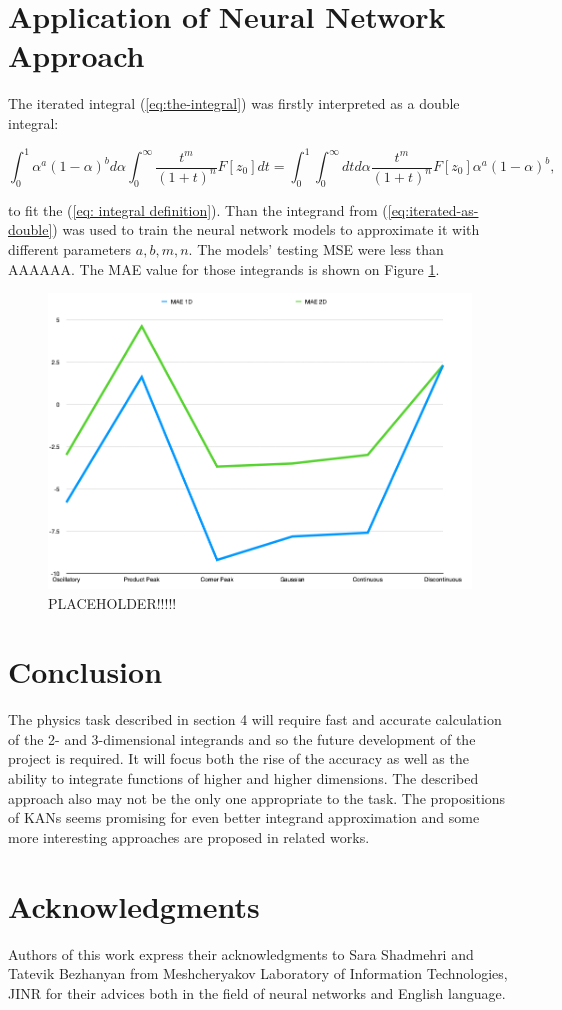 \documentclass[%
]{ittmm}
\begin{document}
\section{Application of Neural Network Approach}

The iterated integral (\ref{eq:the-integral}) was firstly interpreted as a double integral:

\begin{equation}
    \label{eq:iterated-as-double}
     \int_{0}^{1} \alpha^{a}(1 - \alpha)^bd\alpha \int_{0}^{\infty}\frac{t^m}{(1+t)^n}F[z_{0}]dt = 
     \int_{0}^{1} \int_{0}^{\infty} dtd\alpha \frac{t^m}{(1+t)^n}F[z_{0}]\alpha^{a}(1 - \alpha)^b,
\end{equation}

\noindent to fit the (\ref{eq: integral definition}). Than the integrand from (\ref{eq:iterated-as-double}) was used to train the neural network models to approximate it with different parameters $a, b, m, n$. The models' testing MSE were less than AAAAAA. The MAE value for those integrands is shown on Figure \ref{fig:ph-tests}.

\begin{figure}
\centering
\includegraphics[width=0.5\linewidth]{maes.png}
\caption{ PLACEHOLDER!!!!!}
\label{fig:ph-tests}
\end{figure}

\section{Conclusion}

The physics task described in section 4 will require fast and accurate calculation of the 2- and 3-dimensional integrands and so the future development of the project is required. It will focus both the rise of the accuracy as well as the ability to integrate functions of higher and higher dimensions. The described approach also may not be the only one appropriate to the task. The propositions of KANs \cite{liu} seems promising for even better integrand approximation and some more interesting approaches are proposed in related works.

\section{Acknowledgments}

Authors of this work express their acknowledgments to Sara Shadmehri and Tatevik Bezhanyan from Meshcheryakov Laboratory of Information Technologies, JINR for their advices both in the field of neural networks and English language.


\end{document}
